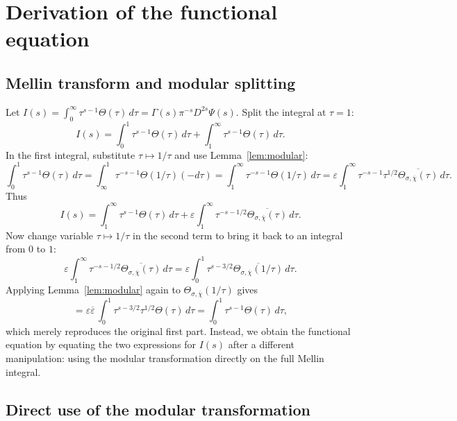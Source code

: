 \documentclass[12pt,a4paper]{article}
\theoremstyle{definition}
\theoremstyle{remark}
\begin{document}

\section{Derivation of the functional equation}

\subsection{Mellin transform and modular splitting}

Let $I(s)=\int_0^\infty \tau^{s-1}\Theta(\tau)\,d\tau
= \Gamma(s)\pi^{-s}D^{2s}\Psi(s)$. Split the integral at $\tau=1$:
\[
I(s)=\int_0^1\tau^{s-1}\Theta(\tau)\,d\tau
  +\int_1^\infty\tau^{s-1}\Theta(\tau)\,d\tau.
\]
In the first integral, substitute $\tau\mapsto1/\tau$ and use
Lemma~\ref{lem:modular}:
\[
\int_0^1\tau^{s-1}\Theta(\tau)\,d\tau
  = \int_\infty^1 \tau^{-s-1}\Theta(1/\tau)(-d\tau)
  = \int_1^\infty \tau^{-s-1}\Theta(1/\tau)\,d\tau
  = \varepsilon\int_1^\infty\tau^{-s-1}\tau^{1/2}
    \overline{\Theta_{\sigma,\overline{\chi}}(\tau)}\,d\tau.
\]
Thus
\[
I(s)=\int_1^\infty\tau^{s-1}\Theta(\tau)\,d\tau
  +\varepsilon\int_1^\infty\tau^{-s-1/2}
  \overline{\Theta_{\sigma,\overline{\chi}}(\tau)}\,d\tau.
\]
Now change variable $\tau\mapsto1/\tau$ in the second term to bring it back to an
integral from $0$ to $1$:
\[
\varepsilon\int_1^\infty\tau^{-s-1/2}
  \overline{\Theta_{\sigma,\overline{\chi}}(\tau)}\,d\tau
= \varepsilon\int_0^1 \tau^{s-3/2}
  \overline{\Theta_{\sigma,\overline{\chi}}(1/\tau)}\,d\tau.
\]
Applying Lemma~\ref{lem:modular} again to
$\Theta_{\sigma,\overline{\chi}}(1/\tau)$ gives
\[
= \varepsilon\overline{\varepsilon}\,
  \int_0^1\tau^{s-3/2}\tau^{1/2}\Theta(\tau)\,d\tau
= \int_0^1\tau^{s-1}\Theta(\tau)\,d\tau,
\]
which merely reproduces the original first part. Instead, we obtain the functional
equation by equating the two expressions for $I(s)$ after a different
manipulation: using the modular transformation directly on the full Mellin
integral.

\subsection{Direct use of the modular transformation}
\end{document}
